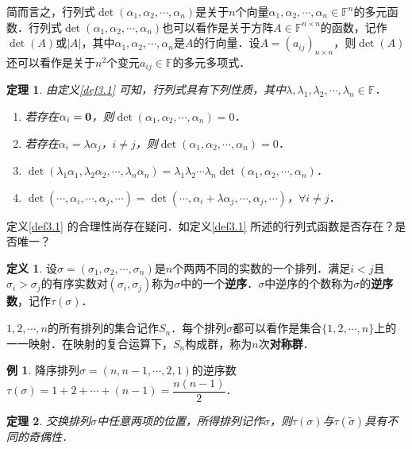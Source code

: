 \documentclass[a4paper,fontset=windows]{ctexbook}
\newtheorem{theorem}{定理}[chapter]
\theoremstyle{definition}
\newtheorem{definition}{定义}[chapter]
\newtheorem{example}{例}[chapter]
\def\note{\noindent\raisebox{10pt}{\dbend}\hspace{7pt}}
\begin{document}
简而言之，行列式$\det(\alpha_1,\alpha_2,\cdots,\alpha_n)$是关于$n$个向量$\alpha_1,\alpha_2,\cdots,\alpha_n\in\mathbb{F}^n$的多元函数．行列式$\det(\alpha_1,\alpha_2,\cdots,\alpha_n)$也可以看作是关于方阵$A\in\mathbb{F}^{n\times n}$的函数，记作$\det(A)$或$|A|$，其中$\alpha_1,\alpha_2,\cdots,\alpha_n$是$A$的行向量．设$A=(a_{ij})_{n\times n}$，则$\det(A)$还可以看作是关于$n^2$个变元$a_{ij}\in\mathbb{F}$的多元多项式．

\begin{theorem}\label{thm3.1}
由定义\ref{def3.1} 可知，行列式具有下列性质，其中$\lambda,\lambda_1,\lambda_2,\cdots,\lambda_n\in\mathbb{F}$．
\begin{enumerate}
\item 若存在$\alpha_i={\bf 0}$，则$\det(\alpha_1,\alpha_2,\cdots,\alpha_n)=0$．

\item 若存在$\alpha_i=\lambda\alpha_j$，$i\ne j$，则$\det(\alpha_1,\alpha_2,\cdots,\alpha_n)=0$．

\item $\det(\lambda_1\alpha_1,\lambda_2\alpha_2,\cdots,\lambda_n\alpha_n)=\lambda_1\lambda_2\cdots\lambda_n\det(\alpha_1,\alpha_2,\cdots,\alpha_n)$．

\item $\det(\cdots,\alpha_i,\cdots,\alpha_j,\cdots)=\det(\cdots,\alpha_i+\lambda\alpha_j,\cdots,\alpha_j,\cdots)$，$\forall i\ne j$．
\end{enumerate}
\end{theorem}

\note 定义\ref{def3.1} 的合理性尚存在疑问．如定义\ref{def3.1} 所述的行列式函数是否存在？是否唯一？

\begin{definition}
设$\sigma=(\sigma_1,\sigma_2,\cdots,\sigma_n)$是$n$个两两不同的实数的一个排列．满足$i<j$且$\sigma_i>\sigma_j$的有序实数对$(\sigma_i,\sigma_j)$称为$\sigma$中的一个{\bf 逆序}．$\sigma$中逆序的个数称为$\sigma$的{\bf 逆序数}，记作$\tau(\sigma)$．

$1,2,\cdots,n$的所有排列的集合记作$S_n$．每个排列$\sigma$都可以看作是集合$\{1,2,\cdots,n\}$上的一一映射．在映射的复合运算下，$S_n$构成群，称为$n$次{\bf 对称群}．
\end{definition}

\begin{example}
降序排列$\sigma=(n,n-1,\cdots,2,1)$的逆序数$\tau(\sigma)=1+2+\cdots+(n-1)=\dfrac{n(n-1)}{2}$．
\end{example}

\begin{theorem}\label{thm3.2}
交换排列$\sigma$中任意两项的位置，所得排列记作$\widetilde{\sigma}$，则$\tau(\sigma)$与$\tau(\widetilde{\sigma})$具有不同的奇偶性．
\end{theorem}
\end{document}
